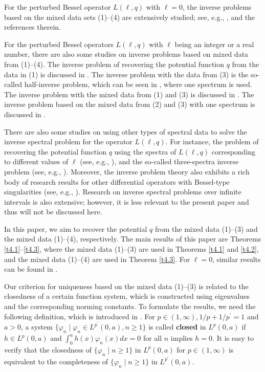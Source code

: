 \documentclass[reqno,12pt,centertags]{amsart}
\numberwithin{equation}{section}
\theoremstyle{definition}
\begin{document}
For the perturbed Bessel operator $L(\ell, q)$ with $\ell=0$, the inverse problems based on the mixed data sets (1)--(4) are extensively studied; see, e.g., \cite{AFR2009,del1997,GS2000,Hat2021,HL1978,Horv2005,HorvO2016,WX2012}, and the references therein. 



For the perturbed Bessel operators $L(\ell, q)$ with $\ell$ being an integer or a real number, there are also some studies on inverse problems based on mixed data from (1)--(4). The inverse problem of recovering the potential function $q$ from the data in (1) is discussed in \cite{Koy2009}. The inverse problem with the data from (3) is the so-called half-inverse problem, which can be seen in \cite{ET2013,Guli2023,HE2005}, where one spectrum is used. The inverse problem with the mixed data from (1) and (3) is discussed in \cite{XYB2023}. The inverse problem based on the mixed data from (2) and (3) with one spectrum is discussed in \cite{YGJ2019}. 

There are also some studies on using other types of spectral data to solve the inverse spectral problem for the operator $L(\ell, q)$. For instance, the problem of recovering the potential function $q$ using the spectra of $L(\ell, q)$ corresponding to different values of $\ell$ (see, e.g., \cite{Aceto2008,CS1994,Chr1993,WPRun2001}),  and the so-called three-spectra inverse problem (see, e.g., \cite{XY2024}). Moreover, the inverse problem theory also exhibits a rich body of research results for other differential operators with Bessel-type singularities (see, e.g., \cite{SRYalA2007,Bondarenko2018,OYurko2002,Yurko2002}). Research on inverse spectral problems over infinite intervals is also extensive; however, it is less relevant to the present paper and thus will not be discussed here.

In this paper, we aim to recover the potential $q$ from the mixed data (1)--(3) and the mixed data (1)--(4), respectively. The main results of this paper are Theorems \ref{t4.1}--\ref{t4.3}, where the mixed data (1)--(3) are used in Theorems \ref{t4.1} and \ref{t4.2}, and the mixed data (1)--(4) are used in Theorem \ref{t4.3}. For $\ell=0$, similar results can be found in \cite{HorvO2016}.

Our criterion for uniqueness based on the mixed data (1)--(3) is related to the closedness of a certain function system, which is constructed using eigenvalues and the corresponding norming constants. To formulate the results, we need the following definition, which is introduced in \cite{Horv2005}. For $p \in(1, \infty), 1/p+1/p^{\prime}=1$ and $a>0$, a system $\{\varphi_n \mid \varphi_n \in L^{p^{\prime}}(0, a), n \geq 1\}$ is called \textbf{closed} in $L^{p}(0, a)$ if $h \in L^{p}(0, a)$ and $\textstyle\int_0^a h(x) \varphi_n(x)dx=0$ for all $n$ implies $h=0$. It is easy to verify that the closedness of $\{\varphi_n \mid  n \geq 1\}$ in $L^{p}(0, a)$ for $p \in(1, \infty)$ is equivalent to the completeness of $\{\varphi_n \mid  n \geq 1\}$ in $L^{p^{\prime}}(0, a)$.
\end{document}
